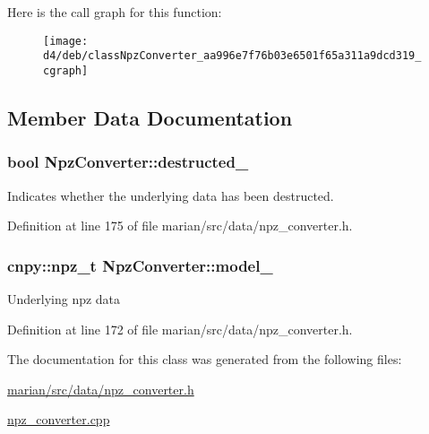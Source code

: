 Here is the call graph for this function\+:
\nopagebreak
\begin{figure}[H]
\begin{center}
\leavevmode
\texttt{[image: d4/deb/classNpzConverter\_aa996e7f76b03e6501f65a311a9dcd319\_cgraph]}
\end{center}
\end{figure}




\subsection{Member Data Documentation}
\subsubsection[{\texorpdfstring{destructed\+\_\+}{destructed_}}]{\setlength{\rightskip}{0pt plus 5cm}bool Npz\+Converter\+::destructed\+\_\+\hspace{0.3cm}{\ttfamily [private]}}\hypertarget{classNpzConverter_a579f761f6926685004bd0a24f7d69ce8}{}\label{classNpzConverter_a579f761f6926685004bd0a24f7d69ce8}
Indicates whether the underlying data has been destructed. 

Definition at line 175 of file marian/src/data/npz\+\_\+converter.\+h.

\subsubsection[{\texorpdfstring{model\+\_\+}{model_}}]{\setlength{\rightskip}{0pt plus 5cm}cnpy\+::npz\+\_\+t Npz\+Converter\+::model\+\_\+\hspace{0.3cm}{\ttfamily [private]}}\hypertarget{classNpzConverter_a467a3df0a9b628e8eaec59bf455749b6}{}\label{classNpzConverter_a467a3df0a9b628e8eaec59bf455749b6}
Underlying npz data 

Definition at line 172 of file marian/src/data/npz\+\_\+converter.\+h.



The documentation for this class was generated from the following files\+:\begin{DoxyCompactItemize}
\item 
\hyperlink{marian_2src_2data_2npz__converter_8h}{marian/src/data/npz\+\_\+converter.\+h}\item 
\hyperlink{npz__converter_8cpp}{npz\+\_\+converter.\+cpp}\end{DoxyCompactItemize}
